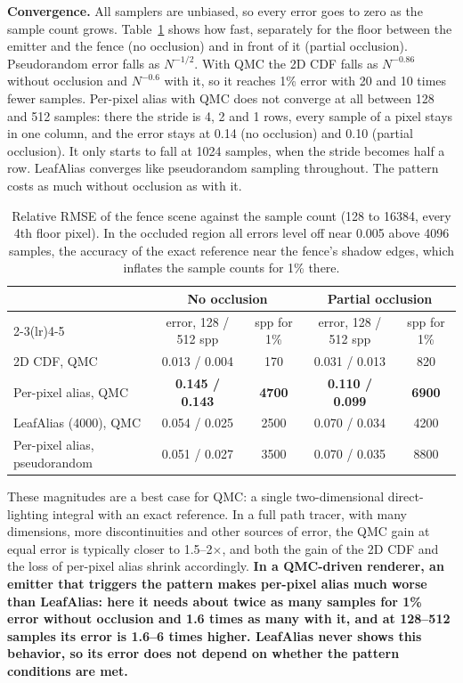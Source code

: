 \documentclass[10pt]{article}
\begin{document}
\textbf{Convergence.} All samplers are unbiased, so every error goes to zero as the sample count grows. Table~\ref{tab:conv} shows how fast, separately for the floor between the emitter and the fence (no occlusion) and in front of it (partial occlusion). Pseudorandom error falls as $N^{-1/2}$. With QMC the 2D CDF falls as $N^{-0.86}$ without occlusion and $N^{-0.6}$ with it, so it reaches 1\% error with 20 and 10 times fewer samples. Per-pixel alias with QMC does not converge at all between 128 and 512 samples: there the stride is 4, 2 and 1 rows, every sample of a pixel stays in one column, and the error stays at 0.14 (no occlusion) and 0.10 (partial occlusion). It only starts to fall at 1024 samples, when the stride becomes half a row. LeafAlias converges like pseudorandom sampling throughout. The pattern costs as much without occlusion as with it.

\begin{table}[H]
\centering\small
\begin{tabular}{lcccc}
\toprule
& \multicolumn{2}{c}{No occlusion} & \multicolumn{2}{c}{Partial occlusion} \\
\cmidrule(lr){2-3}\cmidrule(lr){4-5}
& error, 128 / 512 spp & spp for 1\% & error, 128 / 512 spp & spp for 1\% \\
\midrule
2D CDF, QMC & 0.013 / 0.004 & 170 & 0.031 / 0.013 & 820 \\
Per-pixel alias, QMC & \textbf{0.145 / 0.143} & \textbf{4700} & \textbf{0.110 / 0.099} & \textbf{6900} \\
LeafAlias (4000), QMC & 0.054 / 0.025 & 2500 & 0.070 / 0.034 & 4200 \\
Per-pixel alias, pseudorandom & 0.051 / 0.027 & 3500 & 0.070 / 0.035 & 8800 \\
\bottomrule
\end{tabular}
\caption{Relative RMSE of the fence scene against the sample count (128 to 16384, every 4th floor pixel). In the occluded region all errors level off near 0.005 above 4096 samples, the accuracy of the exact reference near the fence's shadow edges, which inflates the sample counts for 1\% there.}
\label{tab:conv}
\end{table}

These magnitudes are a best case for QMC: a single two-dimensional direct-lighting integral with an exact reference. In a full path tracer, with many dimensions, more discontinuities and other sources of error, the QMC gain at equal error is typically closer to 1.5--2$\times$, and both the gain of the 2D CDF and the loss of per-pixel alias shrink accordingly. \textbf{In a QMC-driven renderer, an emitter that triggers the pattern makes per-pixel alias much worse than LeafAlias: here it needs about twice as many samples for 1\% error without occlusion and 1.6 times as many with it, and at 128--512 samples its error is 1.6--6 times higher. LeafAlias never shows this behavior, so its error does not depend on whether the pattern conditions are met.}
\end{document}
